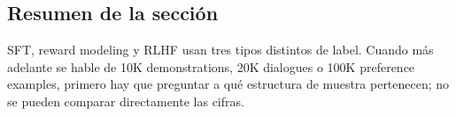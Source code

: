 \subsection{Resumen de la sección}

SFT, reward modeling y RLHF usan tres tipos distintos de label. Cuando más adelante se hable de 10K demonstrations, 20K dialogues o 100K preference examples, primero hay que preguntar a qué estructura de muestra pertenecen; no se pueden comparar directamente las cifras.
